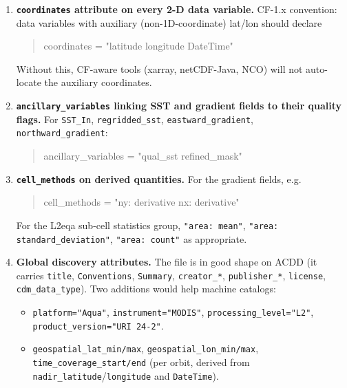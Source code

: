 \documentclass[11pt]{article}
\begin{document}
\begin{enumerate}[leftmargin=*,topsep=2pt,start=7]
  \item \textbf{\texttt{coordinates} attribute on every 2-D data
    variable.} CF-1.x convention: data variables with auxiliary
    (non-1D-coordinate) lat/lon should declare
    \begin{quote}\ttfamily
      coordinates = "latitude longitude DateTime"
    \end{quote}
    Without this, CF-aware tools (xarray, netCDF-Java, NCO) will
    not auto-locate the auxiliary coordinates.

  \item \textbf{\texttt{ancillary\_variables} linking SST and
    gradient fields to their quality flags.} For
    \texttt{SST\_In}, \texttt{regridded\_sst},
    \texttt{eastward\_gradient}, \texttt{northward\_gradient}:
    \begin{quote}\ttfamily
      ancillary\_variables = "qual\_sst refined\_mask"
    \end{quote}

  \item \textbf{\texttt{cell\_methods} on derived quantities.} For
    the gradient fields, e.g.\
    \begin{quote}\ttfamily
      cell\_methods = "ny: derivative nx: derivative"
    \end{quote}
    For the L2eqa sub-cell statistics group, \texttt{"area: mean"},
    \texttt{"area: standard\_deviation"}, \texttt{"area: count"}
    as appropriate.

  \item \textbf{Global discovery attributes.} The file is in good
    shape on ACDD (it carries \texttt{title}, \texttt{Conventions},
    \texttt{Summary}, \texttt{creator\_*}, \texttt{publisher\_*},
    \texttt{license}, \texttt{cdm\_data\_type}). Two additions
    would help machine catalogs:
    \begin{itemize}[topsep=0pt]
      \item \texttt{platform="Aqua"}, \texttt{instrument="MODIS"},
        \texttt{processing\_level="L2"},
        \texttt{product\_version="URI 24-2"}.
      \item \texttt{geospatial\_lat\_min/max},
        \texttt{geospatial\_lon\_min/max},
        \texttt{time\_coverage\_start/end} (per orbit, derived from
        \texttt{nadir\_latitude}/\texttt{longitude} and
        \texttt{DateTime}).
    \end{itemize}


\end{enumerate}
\end{document}
